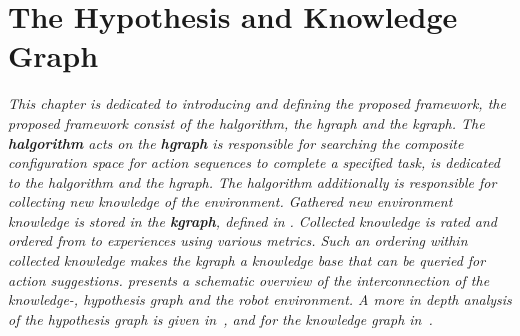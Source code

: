 \chapter{The Hypothesis and Knowledge Graph}%
\label{chap:hgraph_and_kgraph}

\textit{This chapter is dedicated to introducing and defining the proposed framework, the proposed framework consist of the \acl{halgorithm}, the \acl{hgraph} and the \acl{kgraph}. The \textbf{\acl{halgorithm}} acts on the \textbf{\acl{hgraph}} is responsible for searching the composite configuration space for action sequences to complete a specified task,  is dedicated to the \ac{halgorithm} and the \ac{hgraph}. The \ac{halgorithm} additionally is responsible for collecting new knowledge of the environment. Gathered new environment knowledge is stored in the \textbf{\acl{kgraph}}, defined in . Collected knowledge is rated and ordered from  to  experiences using various metrics. Such an ordering within collected knowledge makes the \ac{kgraph} a knowledge base that can be queried for action suggestions.  presents a schematic overview of the interconnection of the knowledge-, hypothesis graph and the robot environment. A more in depth analysis of the hypothesis graph is given in~, and for the knowledge graph in~.}

